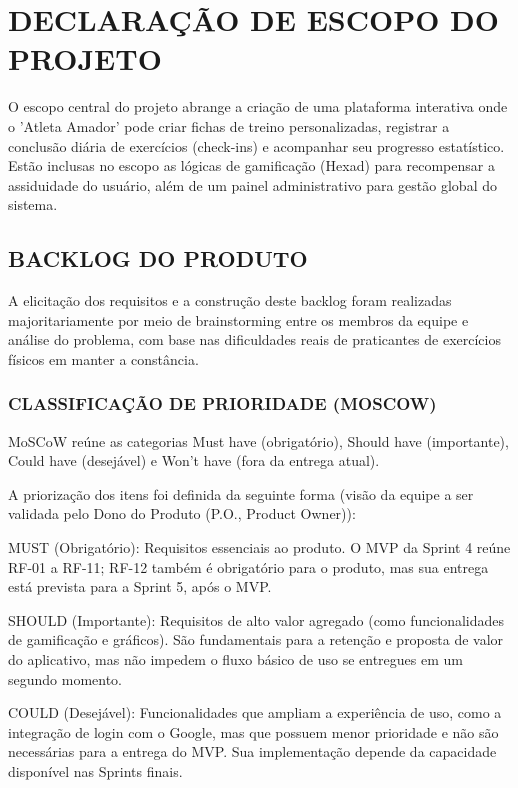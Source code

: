 \clearpage
\section{DECLARAÇÃO DE ESCOPO DO PROJETO}

O escopo central do projeto abrange a criação de uma plataforma interativa onde o 'Atleta Amador' pode criar fichas de treino personalizadas, registrar a conclusão diária de exercícios (check-ins) e acompanhar seu progresso estatístico. Estão inclusas no escopo as lógicas de gamificação (Hexad) para recompensar a assiduidade do usuário, além de um painel administrativo para gestão global do sistema.

\subsection{BACKLOG DO PRODUTO}

A elicitação dos requisitos e a construção deste backlog foram realizadas majoritariamente por meio de brainstorming entre os membros da equipe e análise do problema, com base nas dificuldades reais de praticantes de exercícios físicos em manter a constância.

\subsubsection{CLASSIFICAÇÃO DE PRIORIDADE (MOSCOW)}

MoSCoW reúne as categorias Must have (obrigatório), Should have (importante), Could have (desejável) e Won't have (fora da entrega atual).

A priorização dos itens foi definida da seguinte forma (visão da equipe a ser validada pelo Dono do Produto (P.O., Product Owner)):

MUST (Obrigatório): Requisitos essenciais ao produto. O MVP da Sprint 4 reúne RF-01 a RF-11; RF-12 também é obrigatório para o produto, mas sua entrega está prevista para a Sprint 5, após o MVP.

SHOULD (Importante): Requisitos de alto valor agregado (como funcionalidades de gamificação e gráficos). São fundamentais para a retenção e proposta de valor do aplicativo, mas não impedem o fluxo básico de uso se entregues em um segundo momento.

COULD (Desejável): Funcionalidades que ampliam a experiência de uso, como a integração de login com o Google, mas que possuem menor prioridade e não são necessárias para a entrega do MVP. Sua implementação depende da capacidade disponível nas Sprints finais.

